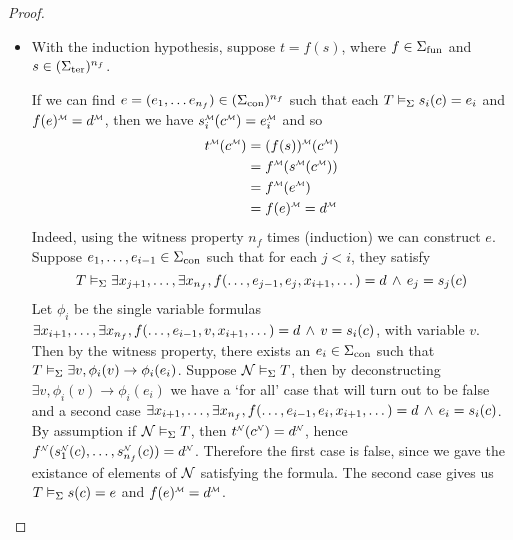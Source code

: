 \begin{proof}
\begin{itemize}
        \item With the induction hypothesis, 
        suppose $t = f(s)$, 
        where $f \in {\Sigma}_\mathrm{fun}$ and $s \in ({\Sigma}_\mathrm{ter})^{n_f}$.
        \begin{forward} 
            If we can find 
            $e = (e_1, \dots e_{n_f}) \in ({\Sigma}_\mathrm{con})^{n_f}$ 
            such that each 
            $T \vDash_{\Sigma} s_i (c) = e_i$
            and $\mmintp{f(e)} = \mmintp{d}$,
            then we have 
            $\mmintp{s_i}(\mmintp{c})
            = \mmintp{e_i}$ and so
            \begin{align*}
                \mmintp{t}(\mmintp{c}) &= 
                \mmintp{(f(s))}(\mmintp{c}) \\ 
                &= \mmintp{f}(
                \mmintp{s}(\mmintp{c})
                ) \\
                &= \mmintp{f}(\mmintp{e}) \\
                &= \mmintp{f(e)} = \mmintp{d}
            \end{align*}
            Indeed, using the witness property $n_f$
            times (induction) we can construct $e$.
            Suppose
            $e_1,\dots, e_{i-1} \in {\Sigma}_\mathrm{con}$
            such that for each $j<i$, 
            they satisfy
            \[T \vDash_{\Sigma} \exists x_{j+1}, \dots, \exists x_{n_f}, f(
                \dots, e_{j-1},e_j,x_{i+1},\dots
                ) = d \, \land \, e_j = s_j (c)\]
            Let $\phi_i$ be the single variable formulas 
            $\exists x_{i+1}, \dots, \exists x_{n_f}, f(
                \dots, e_{i-1},v,x_{i+1},\dots
                ) = d \, \land \, v = s_i (c)$, 
                with variable $v$.
            Then by the witness property,
            there exists an $e_i \in {\Sigma}_\mathrm{con}$ such that
            $T \vDash_{\Sigma} \exists v, \phi_i(v) \to \phi_i(e_i)$.
            Suppose $\mathcal{N} \vDash_{\Sigma} T$,
            then by deconstructing 
            $\exists v, \phi_i(v) \to \phi_i(e_i)$
            we have a `for all' case that will turn out to be false and a second case 
            $\exists x_{i+1}, \dots, \exists x_{n_f}, f(
                \dots, e_{i-1},e_{i},x_{i+1},\dots
                ) = d \, \land \, e_i = s_i (c)$.
            By assumption if $\mathcal{N} \vDash_{\Sigma} T$, 
            then $\nnintp{t}(\nnintp{c}) = \nnintp{d}$,
            hence $\modintp{\NN}{f}(
                \modintp{\NN}{s_1}(c),\dots,\modintp{\NN}{s_{n_f}}(c)
                ) = 
            \modintp{\NN}{d}$.
            Therefore the first case is false,
            since we gave the existance of elements of $\mathcal{N}$ 
            satisfying the formula.  
            The second case gives us 
            $T \vDash_{\Sigma} s(c) = e$
            and $\mmintp{f(e)} = \mmintp{d}$.
        \end{forward}


\end{itemize}
\end{proof}

